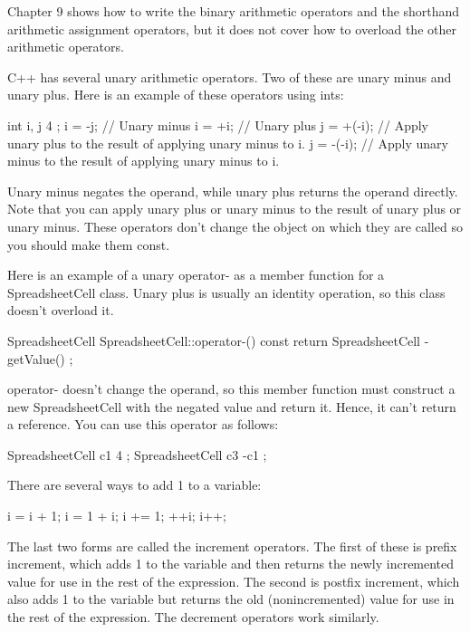 
Chapter 9 shows how to write the binary arithmetic operators and the shorthand arithmetic assignment operators, but it does not cover how to overload the other arithmetic operators.


C++ has several unary arithmetic operators. Two of these are unary minus and unary plus. Here is an example of these operators using ints:

\begin{cpp}
int i, j { 4 };
i = -j; // Unary minus
i = +i; // Unary plus
j = +(-i); // Apply unary plus to the result of applying unary minus to i.
j = -(-i); // Apply unary minus to the result of applying unary minus to i.
\end{cpp}

Unary minus negates the operand, while unary plus returns the operand directly. Note that you can apply unary plus or unary minus to the result of unary plus or unary minus. These operators don’t change the object on which they are called so you should make them const.

Here is an example of a unary operator- as a member function for a SpreadsheetCell class. Unary plus is usually an identity operation, so this class doesn’t overload it.

\begin{cpp}
SpreadsheetCell SpreadsheetCell::operator-() const
{
    return SpreadsheetCell { -getValue() };
}
\end{cpp}

operator- doesn’t change the operand, so this member function must construct a new SpreadsheetCell with the negated value and return it. Hence, it can’t return a reference. You can use this operator as follows:

\begin{cpp}
SpreadsheetCell c1 { 4 };
SpreadsheetCell c3 { -c1 };
\end{cpp}


There are several ways to add 1 to a variable:

\begin{cpp}
i = i + 1;
i = 1 + i;
i += 1;
++i;
i++;
\end{cpp}

The last two forms are called the increment operators. The first of these is prefix increment, which adds 1 to the variable and then returns the newly incremented value for use in the rest of the expression. The second is postfix increment, which also adds 1 to the variable but returns the old (nonincremented) value for use in the rest of the expression. The decrement operators work similarly.

